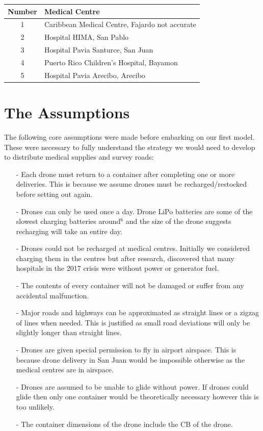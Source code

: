 \documentclass[a4paper,12pt]{article}
\begin{document}
\begin{center}
\begin{tabular}{ |c|l| }
 \hline
 Number & Medical Centre  \\\hline
 1 & Caribbean Medical Centre, Fajardo not accurate  \\
 2 & Hospital HIMA, San Pablo \\
 3 & Hospital Pavia Santurce, San Juan \\
 4 & Puerto Rico Children's Hospital, Bayamon \\
 5 & Hospital Pavia Arecibo, Arecibo  \\
 \hline
\end{tabular}
\end{center}

\section{The Assumptions}
The following core assumptions were made before embarking on our first model. These were necessary to fully understand the strategy we would
need to develop to distribute medical supplies and survey roads:

\begin{itemize}
\item[-]Each drone must return to a container after completing one or more deliveries.
        This is because we assume drones must be recharged/restocked before setting out again.
\item[-]Drones can only be used once a day. Drone LiPo batteries are some of the slowest charging batteries around$^{6}$ and
        the size of the drone suggests recharging will take an entire day.
\item[-]Drones could not be recharged at medical centres.
        Initially we considered charging them in the centres but after research, discovered that
        many hospitals in the 2017 crisis were without power or generator fuel.
\item[-]The contents of every container will not be damaged or suffer from any accidental malfunction.
\item[-]Major roads and highways can be approximated as straight lines or a zigzag of lines when needed. This is justified as small road deviations will only be slightly longer than straight lines.
\item[-]Drones are given special permission to fly in airport airspace. This is because drone delivery in San Juan would be impossible otherwise as the medical centres are in airspace.
\item[-]Drones are assumed to be unable to glide without power. If drones could glide then only one container would be theoretically necessary however this is too unlikely.
\item[-]The container dimensions of the drone include the CB of the drone.
\end{itemize}
\end{document}
